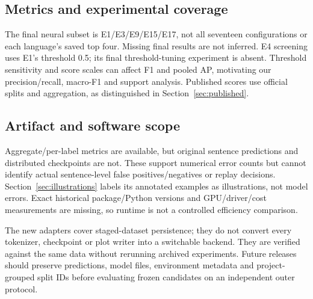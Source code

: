\subsection{Metrics and experimental coverage}
The final neural subset is E1/E3/E9/E15/E17, not all seventeen configurations or each language's saved top four. Missing final results are not inferred. E4 screening uses E1's threshold 0.5; its final threshold-tuning experiment is absent. Threshold sensitivity and score scales can affect F1 and pooled AP, motivating our precision/recall, macro-F1 and support analysis. Published scores use official splits and aggregation, as distinguished in Section~\ref{sec:published}.

\subsection{Artifact and software scope}
Aggregate/per-label metrics are available, but original sentence predictions and distributed checkpoints are not. These support numerical error counts but cannot identify actual sentence-level false positives/negatives or replay decisions. Section~\ref{sec:illustrations} labels its annotated examples as illustrations, not model errors. Exact historical package/Python versions and GPU/driver/cost measurements are missing, so runtime is not a controlled efficiency comparison.

The new adapters cover staged-dataset persistence; they do not convert every tokenizer, checkpoint or plot writer into a switchable backend. They are verified against the same data without rerunning archived experiments. Future releases should preserve predictions, model files, environment metadata and project-grouped split IDs before evaluating frozen candidates on an independent outer protocol.

